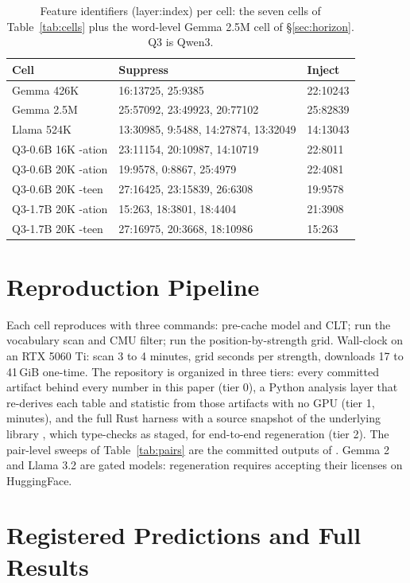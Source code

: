 \documentclass[11pt]{article}
\begin{document}
\begin{table}[h]
\centering\small
\begin{tabular}{@{}lR{2.9cm}l@{}}
\toprule
Cell & Suppress & Inject \\
\midrule
Gemma 426K & 16:13725, 25:9385 & 22:10243 \\
Gemma 2.5M & 25:57092, 23:49923, 20:77102 & 25:82839 \\
Llama 524K & 13:30985, 9:5488, 14:27874, 13:32049 & 14:13043 \\
Q3-0.6B 16K -ation & 23:11154, 20:10987, 14:10719 & 22:8011 \\
Q3-0.6B 20K -ation & 19:9578, 0:8867, 25:4979 & 22:4081 \\
Q3-0.6B 20K -teen & 27:16425, 23:15839, 26:6308 & 19:9578 \\
Q3-1.7B 20K -ation & 15:263, 18:3801, 18:4404 & 21:3908 \\
Q3-1.7B 20K -teen & 27:16975, 20:3668, 18:10986 & 15:263 \\
\bottomrule
\end{tabular}
\caption{Feature identifiers (layer:index) per cell: the seven cells of Table~\ref{tab:cells} plus the word-level Gemma 2.5M cell of \S\ref{sec:horizon}. Q3 is Qwen3.}
\label{tab:features}
\end{table}

\section{Reproduction Pipeline}
\label{app:repro}

Each cell reproduces with three commands: pre-cache model and CLT; run the vocabulary scan and CMU filter; run the position-by-strength grid. Wall-clock on an RTX 5060 Ti: scan 3 to 4 minutes, grid seconds per strength, downloads 17 to 41\,GiB one-time. The repository \citep{paperrepo2026} is organized in three tiers: every committed artifact behind every number in this paper (tier 0), a Python analysis layer that re-derives each table and statistic from those artifacts with no GPU (tier 1, minutes), and the full Rust harness with a source snapshot of the underlying library \citep{candlemi2026}, which type-checks as staged, for end-to-end regeneration (tier 2). The pair-level sweeps of Table~\ref{tab:pairs} are the committed outputs of \citet{pliprs2026}. Gemma 2 and Llama 3.2 are gated models: regeneration requires accepting their licenses on HuggingFace.

\section{Registered Predictions and Full Results}
\label{app:newline}
\end{document}
